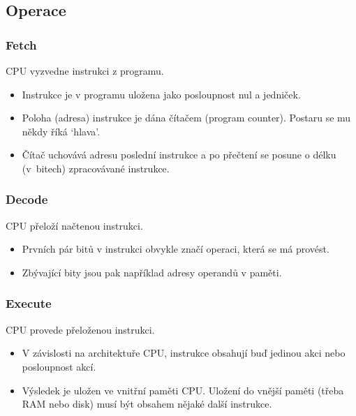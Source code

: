 \documentclass[aspectratio=169,11pt]{beamer}
\begin{document}
\subsection[Operace]{Operace}

\begin{frame}
 \frametitle{Fetch}
 \begin{tcolorbox}[title=Fetch,center,width=.95\textwidth]
  CPU \alert{vyzvedne} instrukci z programu.
 \end{tcolorbox}
 \begin{itemize}
  \item Instrukce je v programu uložena jako posloupnost nul a jedniček.
  \item Poloha (adresa) instrukce je dána čítačem (program counter). Postaru se
   mu někdy říká `hlava'.
  \item Čítač uchovává adresu poslední instrukce a po přečtení se posune o délku
   (v~bitech) zpracovávané instrukce.
 \end{itemize}
\end{frame}

\begin{frame}
 \frametitle{Decode}
 \begin{tcolorbox}[title=Decode,center,width=.95\textwidth]
  CPU \alert{přeloží} načtenou instrukci.
 \end{tcolorbox}
 \begin{itemize}
  \item Prvních pár bitů v instrukci obvykle značí operaci, která se má provést.
  \item Zbývající bity jsou pak například adresy operandů v paměti.
 \end{itemize}
\end{frame}

\begin{frame}
 \frametitle{Execute}
 \begin{tcolorbox}[title=Execute,center,width=.95\textwidth]
  CPU \alert{provede} přeloženou instrukci.
 \end{tcolorbox}
 \begin{itemize}
  \item V závislosti na architektuře CPU, instrukce obsahují buď jedinou akci
   nebo posloupnost akcí.
  \item Výsledek je uložen ve vnitřní paměti CPU. Uložení do vnější paměti
   (třeba RAM nebo disk) musí být obsahem nějaké další instrukce.
 \end{itemize}
\end{frame}
\end{document}
